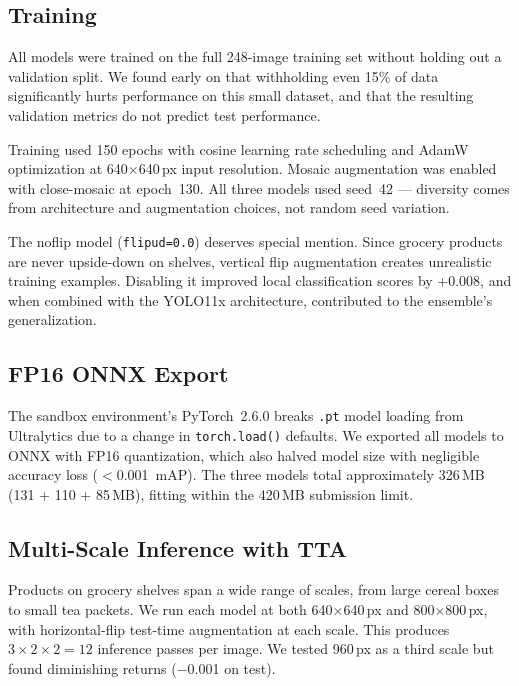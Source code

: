 \documentclass[11pt,a4paper]{article}
\begin{document}
\subsection{Training}
\label{sec:training}

All models were trained on the full 248-image training set without holding out a validation split.
We found early on that withholding even 15\% of data significantly hurts performance on this small dataset, and that the resulting validation metrics do not predict test performance.

Training used 150 epochs with cosine learning rate scheduling and AdamW optimization at 640$\times$640\,px input resolution.
Mosaic augmentation was enabled with close-mosaic at epoch~130.
All three models used seed~42 --- diversity comes from architecture and augmentation choices, not random seed variation.

The noflip model (\texttt{flipud=0.0}) deserves special mention.
Since grocery products are never upside-down on shelves, vertical flip augmentation creates unrealistic training examples.
Disabling it improved local classification scores by +0.008, and when combined with the YOLO11x architecture, contributed to the ensemble's generalization.

\subsection{FP16 ONNX Export}

The sandbox environment's PyTorch~2.6.0 breaks \texttt{.pt} model loading from Ultralytics due to a change in \texttt{torch.load()} defaults.
We exported all models to ONNX with FP16 quantization, which also halved model size with negligible accuracy loss ($<$0.001~mAP).
The three models total approximately 326\,MB (131 + 110 + 85\,MB), fitting within the 420\,MB submission limit.

\subsection{Multi-Scale Inference with TTA}

Products on grocery shelves span a wide range of scales, from large cereal boxes to small tea packets.
We run each model at both 640$\times$640\,px and 800$\times$800\,px, with horizontal-flip test-time augmentation at each scale.
This produces $3 \times 2 \times 2 = 12$ inference passes per image.
We tested 960\,px as a third scale but found diminishing returns ($-$0.001 on test).
\end{document}

